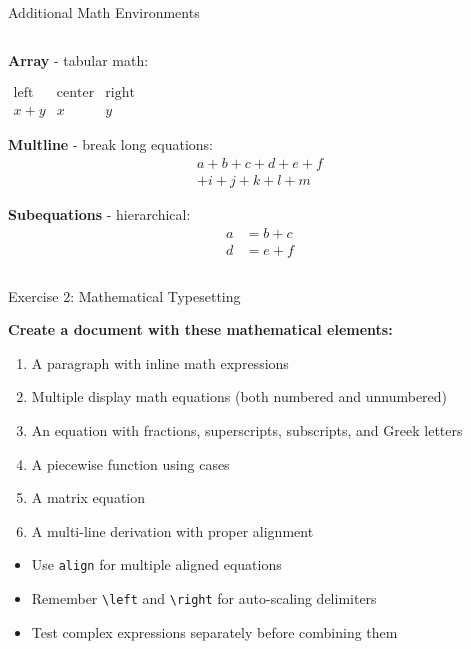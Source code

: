 \begin{frame}[fragile]{Additional Math Environments}
\begin{columns}
\begin{column}{0.5\textwidth}
            \textbf{Array} - tabular math:
            \begin{center}
                $\begin{array}{lcr}
                    \text{left} & \text{center} & \text{right}\\
                    x+y & x & y
                \end{array}$
            \end{center}
            
            \textbf{Multline} - break long equations:
            \begin{multline}
                a + b + c + d + e + f \\
                + i + j + k + l + m
            \end{multline}
            
            \textbf{Subequations} - hierarchical:
            \begin{subequations}
                \begin{align}
                    a &= b + c\\
                    d &= e + f
                \end{align}
            \end{subequations}
        \end{column}
    \end{columns}
\end{frame}

\begin{frame}{Exercise 2: Mathematical Typesetting}
    \begin{practice}
        \textbf{Create a document with these mathematical elements:}
        \begin{enumerate}
            \item A paragraph with inline math expressions
            \item Multiple display math equations (both numbered and unnumbered)
            \item An equation with fractions, superscripts, subscripts, and Greek letters
            \item A piecewise function using cases
            \item A matrix equation
            \item A multi-line derivation with proper alignment
        \end{enumerate}
    \end{practice}
    
    \begin{tip}
        \begin{itemize}
            \item Use \texttt{align} for multiple aligned equations
            \item Remember \texttt{\textbackslash left} and \texttt{\textbackslash right} for auto-scaling delimiters
            \item Test complex expressions separately before combining them
        \end{itemize}
    \end{tip}
\end{frame}
